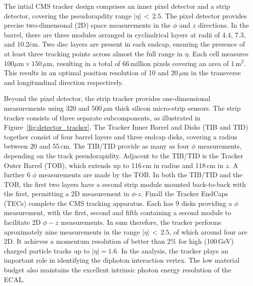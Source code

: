 The intial CMS tracker design comprises an inner pixel detector and a strip detector, covering the pseudorapdity range $|\eta|\,<\,2.5$.
The pixel detector provides precise two-dimensonal (2D) space measurements in the $\phi$ and $z$ directions.
In the barrel, there are three modules arranged in cyclindrical layers at radii of 4.4, 7.3, and 10.2\.cm. 
Two disc layers are present in each endcap, ensuring the presence of at least three tracking points across almost the full range in $\eta$.
Each cell measures $100\mu\textrm{m}\times150\,\mu\textrm{m}$, resulting in a total of 66\,million pixels covering an area of $1\,\textrm{m}^2$.
This results in an optimal position resolution of 10 and $20\,\mu\textrm{m}$ in the transverse and longitundinal direction respectively.

Beyond the pixel detector, the strip tracker provides one-dimensional measurements using 320 and $500\,\mu\textrm{m}$ thick silicon micro-strip sensors.
The strip tracker consists of three separate subcomponents, as illustrated in Figure~\ref{fig:detector_tracker}.
The Tracker Inner Barrel and Disks (TIB and TID) together consist of four barrel layers and three endcap disks, covering a radius between 20 and 55\,cm. %
The TIB/TID provide as many as four $\phi$ measurements, depending on the track pesudorapidity.
Adjacent to the TIB/TID is the Tracker Outer Barrel (TOB), which extends up to 116\,cm in radius and 118\,cm in $z$.
A further 6 $\phi$ measurements are made by the TOB.
In both the TIB/TID and the TOB, the first two layers have a second strip module mounted back-to-back with the first, permitting a 2D measurement in $\phi$-$z$.
Finall the Tracker EndCaps (TECs) complete the CMS tracking apparatus.
Each has 9 disks providing a $\phi$ measurement, with the first, second and fifth containing a second module to facilitate 2D $\phi-z$ measurements.
In sum therefore, the tracker performs aproximately nine measurements in the range $|\eta|\,<\,2.5$, of which around four are 2D.
It achieves a momentum resolution of better than 2\% for high \pt (100\,GeV) charged particle tracks up to $|\eta|=1.6$.%
In the \Hgg analysis, the tracker plays an important role in identifying the diphoton interaction vertex. %
The low material budget also maintains the excellent intrinsic photon energy resolution of the ECAL.

